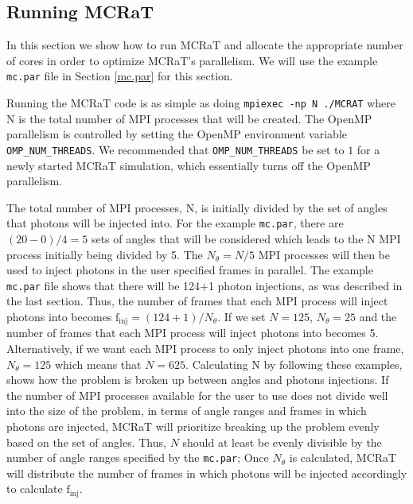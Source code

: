 \documentclass[12pt,a4paper]{article}
\begin{document}
\subsection{Running MCRaT}
In this section we show how to run MCRaT and allocate the appropriate number of cores in order to optimize MCRaT's parallelism. We will use the example \texttt{mc.par} file in Section \ref{mc.par} for this section. 

Running the MCRaT code is as simple as doing \texttt{mpiexec -np N ./MCRAT} where N is the total number of MPI processes that will be created. The OpenMP parallelism is controlled by setting the OpenMP environment variable \texttt{OMP\_NUM\_THREADS}. We recommended that \texttt{OMP\_NUM\_THREADS} be set to $1$ for a newly started MCRaT simulation, which essentially turns off the OpenMP parallelism. 

 The total number of MPI processes, N, is initially divided by the set of angles that photons will be injected into. For the example \texttt{mc.par}, there are $(20-0)/4=5$ sets of angles that will be considered which leads to the N MPI process initially being divided by 5. The $N_\theta=N/5$ MPI processes will then be used to inject photons in the user specified frames in parallel. The example \texttt{mc.par} file shows that there will be 124+1 photon injections, as was described in the last section. Thus, the number of frames that each MPI process will inject photons into becomes $\mathrm{f_{inj}}=(124+1)/N_\theta$. If we set $N=125$, $N_\theta=25$ and the number of frames that each MPI process will inject photons into becomes 5. Alternatively, if we want each MPI process to only inject photons into one frame, $N_\theta=125$ which means that $N=625$. Calculating N by following these examples, shows how the problem is broken up between angles and photons injections. If the number of MPI processes available for the user to use does not divide well into the size of the problem, in terms of angle ranges and frames in which photons are injected, MCRaT will prioritize breaking up the problem evenly based on the set of angles. Thus, $N$ should at least be evenly divisible by the number of angle ranges specified by the \texttt{mc.par}; Once $N_\theta$ is calculated, MCRaT will distribute the number of frames in which photons will be injected accordingly to calculate $\mathrm{f_{inj}}$.
 
\end{document}
